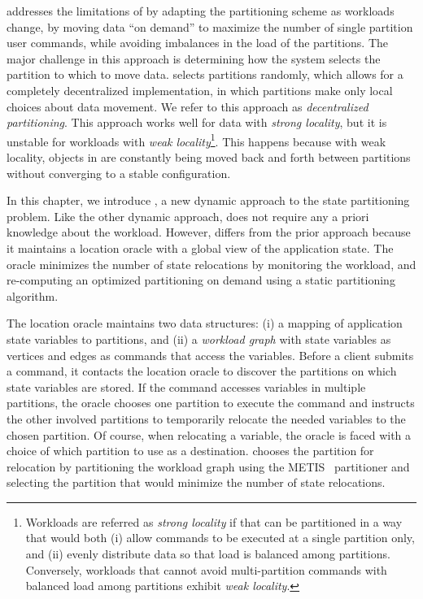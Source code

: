 
\dssmr{} addresses the limitations of \ssmr{} by adapting the partitioning
scheme as workloads change, by moving data ``on demand'' to maximize the number
of single partition user commands, while avoiding imbalances in the load of the
partitions. The major challenge in this approach is determining how the system
selects the partition to which to move data. \dssmr{} selects partitions
randomly, which allows for a completely decentralized implementation, in which
partitions make only local choices about data movement. We refer to this
approach as \emph{decentralized partitioning}. This approach works well for data
with \emph{strong locality}, but it is unstable for workloads with \emph{weak
locality}\footnote{Workloads are referred as \emph{strong locality} if that can
be partitioned in a way that would both (i) allow commands to be executed at a
single partition only, and (ii) evenly distribute data so that load is balanced
among partitions. Conversely, workloads that cannot avoid multi-partition
commands with balanced load among partitions exhibit \emph{weak locality}.}.
This happens because with weak locality, objects in \dssmr{} are constantly
being moved back and forth between partitions without converging to a stable
configuration.

In this chapter, we introduce \dynastar, a new dynamic approach to the state
partitioning problem. Like the other dynamic approach, \dynastar does not
require any a priori knowledge about the workload. However, \dynastar differs
from the prior approach because it maintains a location oracle with a global
view of the application state. The oracle minimizes the number of state
relocations by monitoring the workload, and re-computing an optimized
partitioning on demand using a static partitioning algorithm.

The location oracle maintains two data structures: (i) a mapping of application
state variables to partitions, and (ii) a \emph{workload graph} with state
variables as vertices and edges as commands that access the variables. Before a
client submits a command, it contacts the location oracle to discover the
partitions on which state variables are stored.  If the command accesses
variables in multiple partitions, the oracle chooses one partition to execute
the command and instructs the other involved partitions to temporarily relocate
the needed variables to the chosen partition. Of course, when relocating a
variable, the oracle is faced with a choice of which partition to use as a
destination. \dynastar chooses the partition for relocation by partitioning the
workload graph using the METIS~\cite{Abou-Rjeili:2006} partitioner and selecting
the partition that would minimize the number of state relocations.

